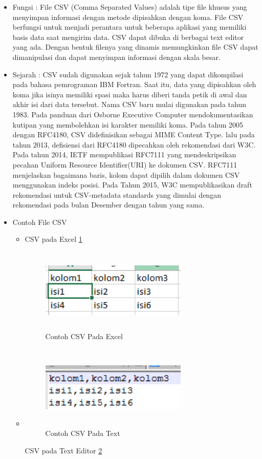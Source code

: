 \begin{itemize}
	\item Fungsi : 
	File CSV (Comma Separated Values) adalah tipe file khusus yang menyimpan informasi dengan metode dipisahkan dengan koma. File CSV berfungsi untuk menjadi perantara untuk beberapa aplikasi yang memiliki basis data saat mengirim data. CSV dapat dibuka di berbagai text editor
	yang ada. Dengan bentuk filenya yang dinamis memungkinkan file CSV dapat dimanipulasi dan dapat menyimpan informasi dengan skala besar.
	\item Sejarah :
	CSV sudah digunakan sejak tahun 1972 yang dapat dikompilasi pada bahasa pemrograman IBM Fortran. Saat itu, data yang dipisahkan oleh koma jika isinya memiliki spasi maka harus diberi tanda petik di awal dan akhir isi dari data tersebut. Nama CSV baru mulai digunakan pada tahun 1983. Pada panduan dari Osborne Executive Computer mendokumentasikan kutipan yang membolehkan isi karakter memiliki koma.  Pada tahun 2005 dengan RFC4180, CSV didefinisikan sebagai MIME Content Type. lalu pada tahun 2013, defisiensi dari RFC4180 dipecahkan oleh rekomendasi dari W3C. Pada tahun 2014, IETF mempublikasi RFC7111 yang mendeskripsikan pecahan Uniform Resource Identifier(URI) ke dokumen CSV. RFC7111 menjelaskan bagaimana baris, kolom dapat dipilih dalam dokumen CSV menggunakan indeks posisi. Pada Tahun 2015, W3C mempublikasikan draft rekomendasi untuk CSV-metadata standards yang dimulai dengan rekomendasi pada bulan Desember dengan tahun yang sama. 
	\item Contoh File CSV \begin{itemize}
							\item 
							CSV pada Excel \ref{1174035_CSVExcel}
							\begin{figure}[!htbp]
								\centering
								\includegraphics[height=4cm, width=7cm]{figures/4/1174035/Teori/1174035_CSVExcel.jpg}
								\caption{Contoh CSV Pada Excel}
								\label{1174035_CSVExcel}
							\end{figure}
							\item \begin{figure}[!htbp]
								\centering
								\includegraphics[height=4cm, width=7cm]{figures/4/1174035/Teori/1174035_CSVText.jpg}
								\caption{Contoh CSV Pada Text}
								\label{1174035_CSVText}
							\end{figure}
							CSV pada Text Editor \ref{1174035_CSVText}
							

\end{itemize}
\end{itemize}
